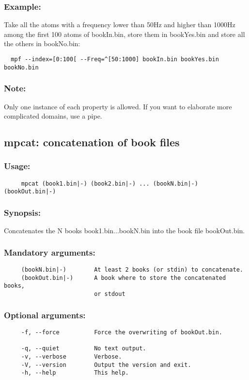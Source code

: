 \documentclass[11pt,a4paper]{article}
\begin{document}
\subsubsection*{Example:}
Take all the atoms with a frequency lower than 50Hz and higher than 1000Hz
among the first 100 atoms of bookIn.bin, store them in bookYes.bin and store
all the others in bookNo.bin:
\begin{verbatim}
  mpf --index=[0:100[ --Freq=^[50:1000] bookIn.bin bookYes.bin bookNo.bin
\end{verbatim}

\subsubsection*{Note:}
Only one instance of each property is allowed. If you want to elaborate more
complicated domains, use a pipe.


\clearpage
\subsection{mpcat: concatenation of book files}

\subsubsection*{Usage:}
\begin{verbatim}
     mpcat (book1.bin|-) (book2.bin|-) ... (bookN.bin|-) (bookOut.bin|-)
\end{verbatim}

\subsubsection*{Synopsis:}
Concatenates the N books book1.bin...bookN.bin into the book file bookOut.bin.

\subsubsection*{Mandatory arguments:}
\begin{verbatim}
     (bookN.bin|-)        At least 2 books (or stdin) to concatenate.
     (bookOut.bin|-)      A book where to store the concatenated books,
                          or stdout
\end{verbatim}

\subsubsection*{Optional arguments:}
\begin{verbatim}
     -f, --force          Force the overwriting of bookOut.bin.

     -q, --quiet          No text output.
     -v, --verbose        Verbose.
     -V, --version        Output the version and exit.
     -h, --help           This help.
\end{verbatim}
\end{document}
